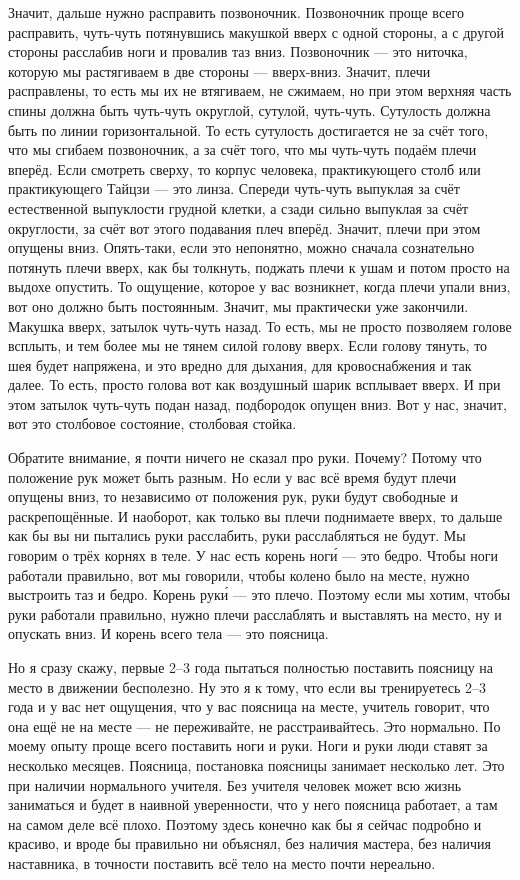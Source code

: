Значит, дальше нужно расправить позвоночник. Позвоночник проще всего расправить, чуть-чуть
потянувшись макушкой вверх с одной стороны, а с другой стороны расслабив ноги и провалив таз
вниз. Позвоночник --- это ниточка, которую мы растягиваем в две стороны --- вверх-вниз. Значит,
плечи расправлены, то есть мы их не втягиваем, не сжимаем, но при этом верхняя часть спины должна
быть чуть-чуть округлой, сутулой, чуть-чуть. Сутулость должна быть по линии горизонтальной. То
есть сутулость достигается не за счёт того, что мы сгибаем позвоночник, а за счёт того, что мы
чуть-чуть подаём плечи вперёд. Если смотреть сверху, то корпус человека, практикующего столб
или практикующего Тайцзи --- это линза. Спереди чуть-чуть выпуклая за счёт естественной
выпуклости грудной клетки, а сзади сильно выпуклая за счёт округлости, за счёт вот этого
подавания плеч вперёд. Значит, плечи при этом опущены вниз. Опять-таки, если это непонятно,
можно сначала сознательно потянуть плечи вверх, как бы толкнуть, поджать плечи к ушам и потом
просто на выдохе опустить. То ощущение, которое у вас возникнет, когда плечи упали вниз, вот
оно должно быть постоянным. Значит, мы практически уже закончили. Макушка вверх, затылок
чуть-чуть назад. То есть, мы не просто позволяем голове всплыть, и тем более мы не тянем силой
голову вверх. Если голову тянуть, то шея будет напряжена, и это вредно для дыхания, для
кровоснабжения и так далее. То есть, просто голова вот как воздушный шарик всплывает вверх. И при
этом затылок чуть-чуть подан назад, подбородок опущен вниз. Вот у нас, значит, вот это столбовое
состояние, столбовая стойка.

Обратите внимание, я почти ничего не сказал про руки. Почему?
Потому что положение рук может быть разным. Но если у вас всё время будут плечи опущены вниз,
то независимо от положения рук, руки будут свободные и раскрепощённые. И наоборот, как только вы
плечи поднимаете вверх, то дальше как бы вы ни пытались руки расслабить, руки расслабляться не
будут. Мы говорим о трёх корнях в теле. У нас есть корень ног\'и --- это бедро. Чтобы ноги
работали правильно, вот мы говорили, чтобы колено было на месте, нужно выстроить таз и бедро.
Корень рук\'и --- это плечо. Поэтому если мы хотим, чтобы руки работали правильно, нужно плечи
расслаблять и выставлять на место, ну и опускать вниз. И корень всего тела --- это поясница.

Но я сразу скажу, первые 2--3 года пытаться полностью поставить поясницу на место в движении
бесполезно. Ну это я к тому, что если вы тренируетесь 2--3 года и у вас нет ощущения, что у вас
поясница на месте, учитель говорит, что она ещё не на месте --- не переживайте, не
расстраивайтесь. Это нормально. По моему опыту проще всего поставить ноги и руки. Ноги и руки
люди ставят за несколько месяцев. Поясница, постановка поясницы занимает несколько лет. Это при
наличии нормального учителя. Без учителя человек может всю жизнь заниматься и будет в наивной
уверенности, что у него поясница работает, а там на самом деле всё плохо. Поэтому здесь
конечно как бы я сейчас подробно и красиво, и вроде бы правильно ни объяснял, без
наличия мастера, без наличия наставника, в точности поставить всё тело на место почти нереально.

